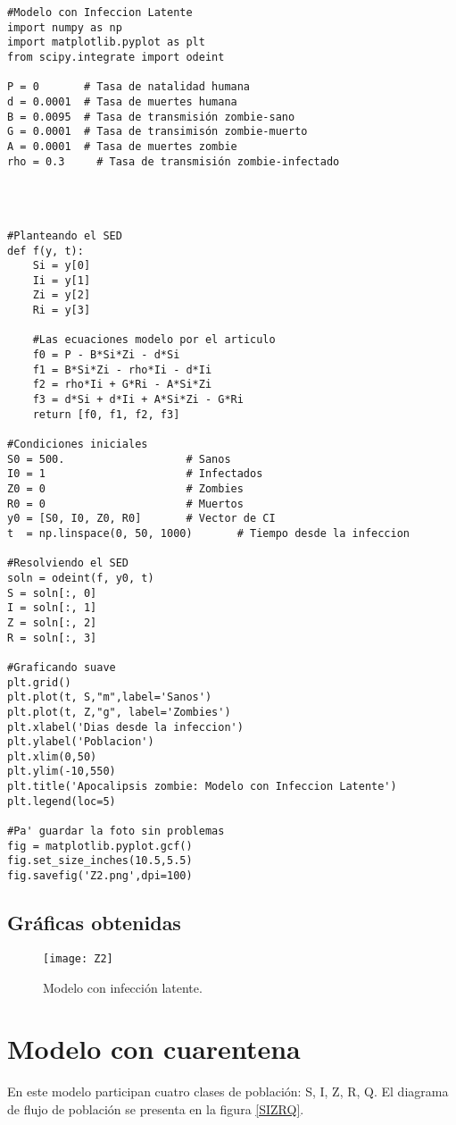 \documentclass[12pt]{article}
\begin{document}
{\color{RedViolet}\begin{verbatim}
#Modelo con Infeccion Latente
import numpy as np
import matplotlib.pyplot as plt
from scipy.integrate import odeint

P = 0       # Tasa de natalidad humana
d = 0.0001  # Tasa de muertes humana
B = 0.0095  # Tasa de transmisión zombie-sano
G = 0.0001  # Tasa de transimisón zombie-muerto
A = 0.0001  # Tasa de muertes zombie
rho = 0.3     # Tasa de transmisión zombie-infectado




#Planteando el SED
def f(y, t):
    Si = y[0]
    Ii = y[1]
    Zi = y[2]
    Ri = y[3]
  
    #Las ecuaciones modelo por el articulo
    f0 = P - B*Si*Zi - d*Si
    f1 = B*Si*Zi - rho*Ii - d*Ii
    f2 = rho*Ii + G*Ri - A*Si*Zi
    f3 = d*Si + d*Ii + A*Si*Zi - G*Ri
    return [f0, f1, f2, f3]

#Condiciones iniciales
S0 = 500.                   # Sanos
I0 = 1                      # Infectados
Z0 = 0                      # Zombies
R0 = 0                      # Muertos
y0 = [S0, I0, Z0, R0]       # Vector de CI
t  = np.linspace(0, 50, 1000)       # Tiempo desde la infeccion

#Resolviendo el SED
soln = odeint(f, y0, t)
S = soln[:, 0]
I = soln[:, 1]
Z = soln[:, 2]
R = soln[:, 3]

#Graficando suave
plt.grid()
plt.plot(t, S,"m",label='Sanos')
plt.plot(t, Z,"g", label='Zombies')
plt.xlabel('Dias desde la infeccion')
plt.ylabel('Poblacion')
plt.xlim(0,50)
plt.ylim(-10,550)
plt.title('Apocalipsis zombie: Modelo con Infeccion Latente')
plt.legend(loc=5)

#Pa' guardar la foto sin problemas
fig = matplotlib.pyplot.gcf()
fig.set_size_inches(10.5,5.5)
fig.savefig('Z2.png',dpi=100)
\end{verbatim}}

\subsection*{Gráficas obtenidas}

\begin{figure}[H]
\centering
 \texttt{[image: Z2]}
 \caption{Modelo con infección latente.}
\end{figure}

\section{Modelo con cuarentena}
En este modelo participan cuatro clases de población: S, I, Z, R, Q. El diagrama de flujo de población se presenta en la figura \ref{SIZRQ}.
\end{document}
